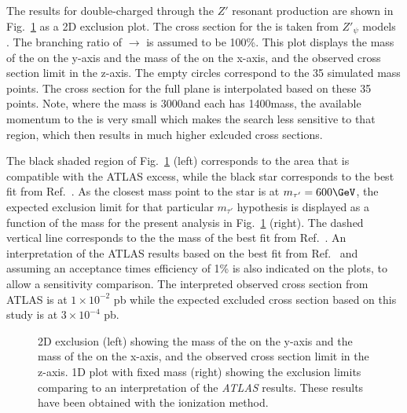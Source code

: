 The results for double-charged \TauPrime through the $Z'$ resonant production are shown in Fig.~\ref{fig:massLimZPrimeTauPrime} as a 2D 
exclusion plot. The cross section for the \ZPrime is taken from $Z'_{\psi}$ models \cite{Accomando:2010fz}. The branching ratio of 
\ZPrime $\rightarrow$ \TauPrime \TauPrime is assumed to be 100\%. This plot displays the mass of the \ZPrime on the y-axis and the mass 
of the \TauPrime on the x-axis, and the observed cross section limit in the z-axis. The empty circles correspond to the 35 simulated mass points.
The cross section for the full plane is interpolated based on these 35 points.  Note, where the \ZPrime mass is 3000\GeV and each \TauPrime has 1400\GeV mass, 
the available momentum to the  \TauPrime is very small which makes the search less sensitive to that region, which then results in much higher exlcuded cross sections.

The black shaded region of Fig.~\ref{fig:massLimZPrimeTauPrime} (left)  corresponds to the area that is compatible with the {ATLAS} excess, while the black star corresponds to the best fit 
from Ref.~\cite{Giudice_2022}. 
As the closest mass point to the star is at $m_{\tau'}=600\GeV$, 
the expected exclusion limit for that particular $m_{\tau'}$ hypothesis is displayed  as a function of the \ZPrime  mass for the present
analysis in Fig.~\ref{fig:massLimZPrimeTauPrime} (right). 
The dashed vertical line corresponds to the the  \ZPrime  mass of the best fit from Ref.~\cite{Giudice_2022}. 
An interpretation of the ATLAS results based on the best fit from Ref.~\cite{Giudice_2022} and 
assuming an acceptance times efficiency of 1\% is also indicated on the plots, to allow a sensitivity comparison.
The interpreted observed cross section from {ATLAS} is at $1\times 10^{-2}$ pb while the expected excluded cross section based on this study 
is at $3\times 10^{-4}$ pb. 

 \begin{figure}[h!]
    \centering
    \caption{2D exclusion (left) showing the mass of the \ZPrime on the y-axis and the mass of the \TauPrime on the x-axis, and the observed cross section limit in the z-axis. 1D plot with fixed  \TauPrime mass (right) showing the exclusion limits comparing to an interpretation of the \textit{ATLAS} results. These results have been obtained with the ionization method.}
    \label{fig:massLimZPrimeTauPrime}
\end{figure}


